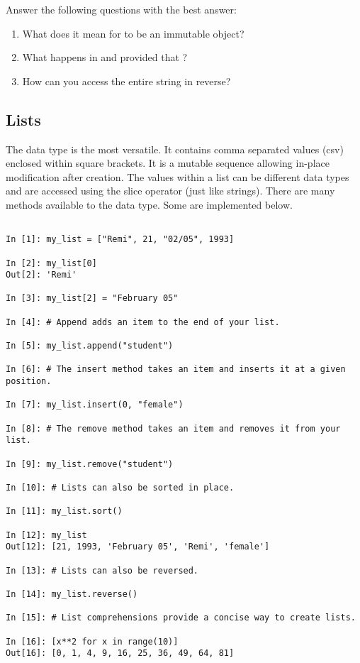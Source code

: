 \begin{problem}
Answer the following questions with the best answer:

\begin{enumerate}

\item What does it mean for  to be an immutable object? 
\item What happens in  and  provided 
that ? 
\item How can you access the entire string in reverse?

\end{enumerate}
\end{problem}

\subsection*{Lists}
\begin{example}

The  data type is the most versatile. 
It contains comma separated values (csv) enclosed within square brackets. 
It is a mutable sequence allowing in-place modification after creation. 
The values within a list can be different data types and are accessed using the 
slice operator (just like strings). 
There are many methods available to the  data type. 
Some are implemented below. 

\begin{lstlisting}

In [1]: my_list = ["Remi", 21, "02/05", 1993]

In [2]: my_list[0]
Out[2]: 'Remi'

In [3]: my_list[2] = "February 05"

In [4]: # Append adds an item to the end of your list.

In [5]: my_list.append("student")

In [6]: # The insert method takes an item and inserts it at a given position. 

In [7]: my_list.insert(0, "female")

In [8]: # The remove method takes an item and removes it from your list.

In [9]: my_list.remove("student")

In [10]: # Lists can also be sorted in place. 

In [11]: my_list.sort()

In [12]: my_list
Out[12]: [21, 1993, 'February 05', 'Remi', 'female']

In [13]: # Lists can also be reversed.

In [14]: my_list.reverse()

In [15]: # List comprehensions provide a concise way to create lists. 

In [16]: [x**2 for x in range(10)]
Out[16]: [0, 1, 4, 9, 16, 25, 36, 49, 64, 81]

\end{lstlisting}
\end{example}

